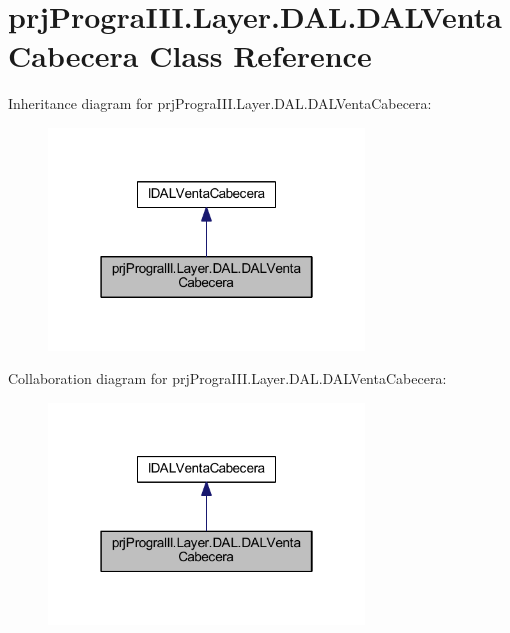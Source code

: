 \hypertarget{classprj_progra_i_i_i_1_1_layer_1_1_d_a_l_1_1_d_a_l_venta_cabecera}{}\section{prj\+Progra\+I\+I\+I.\+Layer.\+D\+A\+L.\+D\+A\+L\+Venta\+Cabecera Class Reference}
\label{classprj_progra_i_i_i_1_1_layer_1_1_d_a_l_1_1_d_a_l_venta_cabecera}


Inheritance diagram for prj\+Progra\+I\+I\+I.\+Layer.\+D\+A\+L.\+D\+A\+L\+Venta\+Cabecera\+:
\nopagebreak
\begin{figure}[H]
\begin{center}
\leavevmode
\includegraphics[width=238pt]{classprj_progra_i_i_i_1_1_layer_1_1_d_a_l_1_1_d_a_l_venta_cabecera__inherit__graph}
\end{center}
\end{figure}


Collaboration diagram for prj\+Progra\+I\+I\+I.\+Layer.\+D\+A\+L.\+D\+A\+L\+Venta\+Cabecera\+:
\nopagebreak
\begin{figure}[H]
\begin{center}
\leavevmode
\includegraphics[width=238pt]{classprj_progra_i_i_i_1_1_layer_1_1_d_a_l_1_1_d_a_l_venta_cabecera__coll__graph}
\end{center}
\end{figure}
